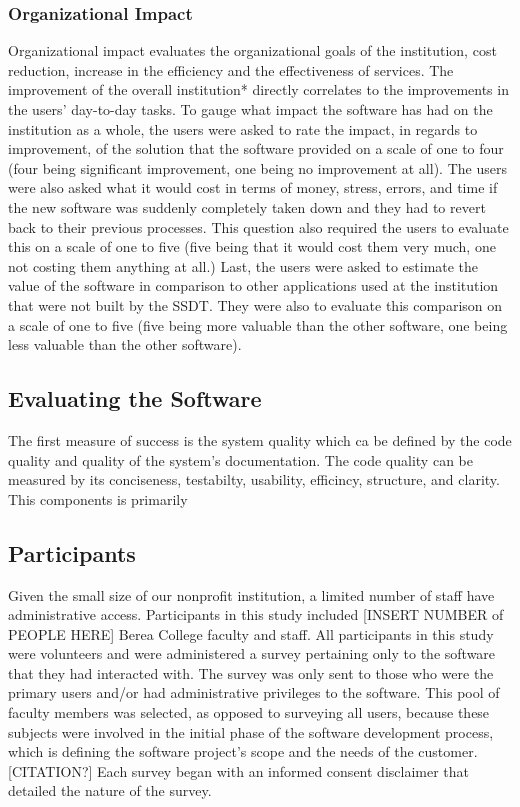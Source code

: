 \subsubsection{Organizational Impact}
Organizational impact evaluates the organizational goals of the institution, cost reduction, increase in the efficiency and the effectiveness of services. The improvement of the overall institution* directly correlates to the improvements in the users' day-to-day tasks. To gauge what impact the software has had on the institution as a whole, the users were asked to rate the impact, in regards to improvement, of the solution that the software provided on a scale of one to four (four being significant improvement, one being no improvement at all). The users were also asked what it would cost in terms of money, stress, errors, and time if the new software was suddenly completely taken down and they had to revert back to their previous processes. This question also required the users to evaluate this on a scale of one to five (five being that it would cost them very much, one not costing them anything at all.) Last, the users were asked to estimate the value of the software in comparison to other applications used at the institution that were not built by the SSDT. They were also to evaluate this comparison on a scale of one to five (five being more valuable than the other software, one being less valuable than the other software).


\subsection{Evaluating the Software}
 The first measure of success is the system quality which ca be defined by the code quality and quality of the system's documentation. The code quality can be measured by its conciseness, testabilty, usability, efficincy, structure, and clarity. This components is primarily


\subsection{Participants}
Given the small size of our nonprofit institution, a limited number of staff have administrative access. Participants in this study included [INSERT NUMBER of PEOPLE HERE] Berea College faculty and staff. All participants in this study were volunteers and were administered a survey pertaining only to the software that they had interacted with. The survey was only sent to those who were the primary users and/or had administrative privileges to the software. This pool of faculty members was selected, as opposed to surveying all users, because these subjects were involved in the initial phase of the software development process, which is defining the software project’s scope and the needs of the customer. [CITATION?] Each survey began with an informed consent disclaimer that detailed the nature of the survey.

